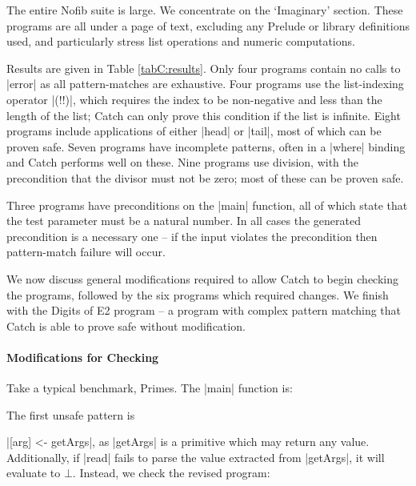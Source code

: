 The entire Nofib suite \cite{nofib} is large. We concentrate on the `Imaginary' section. These programs are all under a page of text, excluding any Prelude or library definitions used, and particularly stress list operations and numeric computations.

Results are given in Table \ref{tabC:results}. Only four programs contain no calls to |error| as all pattern-matches are exhaustive. Four programs use the list-indexing operator |(!!)|, which requires the index to be non-negative and less than the length of the list; Catch can only prove this condition if the list is infinite. Eight programs include applications of either |head| or |tail|, most of which can be proven safe. Seven programs have incomplete patterns, often in a |where| binding and Catch performs well on these. Nine programs use division, with the precondition that the divisor must not be zero; most of these can be proven safe.

Three programs have preconditions on the |main| function, all of which state that the test parameter must be a natural number. In all cases the generated precondition is a necessary one -- if the input violates the precondition then pattern-match failure will occur.

We now discuss general modifications required to allow Catch to begin checking the programs, followed by the six programs which required changes. We finish with the Digits of E2 program -- a program with complex pattern matching that Catch is able to prove safe without modification.

\paragraph{Modifications for Checking}

Take a typical benchmark, Primes. The |main| function is:

\begin{comment}
\begin{code}
primes :: [Int]
\end{code}
\end{comment}


The first unsafe pattern is \ignore|[arg] <- getArgs|, as |getArgs| is a primitive which may return any value. Additionally, if |read| fails to parse the value extracted from |getArgs|, it will evaluate to $\bot{}$. Instead, we check the revised program:

